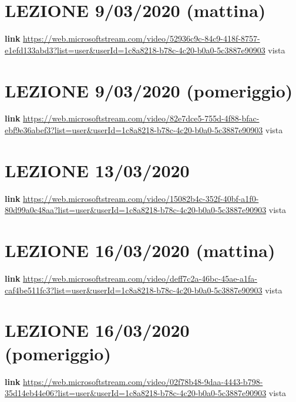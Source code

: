 \documentclass[a4paper, 9pt]{article}
\begin{document}
\maketitle

\section{LEZIONE 9/03/2020 (mattina)}
\textbf{link} \url{https://web.microsoftstream.com/video/52936c9c-84c9-418f-8757-e1efd133abd3?list=user&userId=1c8a8218-b78c-4c20-b0a0-5c3887e90903} vista
\section{LEZIONE 9/03/2020 (pomeriggio)}
\textbf{link} \url{https://web.microsoftstream.com/video/82e7dce5-755d-4f88-bfac-ebf9e36abef3?list=user&userId=1c8a8218-b78c-4c20-b0a0-5c3887e90903} vista
\section{LEZIONE 13/03/2020}
\textbf{link} \url{https://web.microsoftstream.com/video/15082b4c-352f-40bf-a1f0-80d99a0c48aa?list=user&userId=1c8a8218-b78c-4c20-b0a0-5c3887e90903} vista
\section{LEZIONE 16/03/2020 (mattina)}
\textbf{link} \url{https://web.microsoftstream.com/video/deff7c2a-46bc-45ae-a1fa-caf4be511fc3?list=user&userId=1c8a8218-b78c-4c20-b0a0-5c3887e90903} vista
\section{LEZIONE 16/03/2020 (pomeriggio)}
\textbf{link} \url{https://web.microsoftstream.com/video/02f78b48-9daa-4443-b798-35d14eb44e06?list=user&userId=1c8a8218-b78c-4c20-b0a0-5c3887e90903} vista
\end{document}
